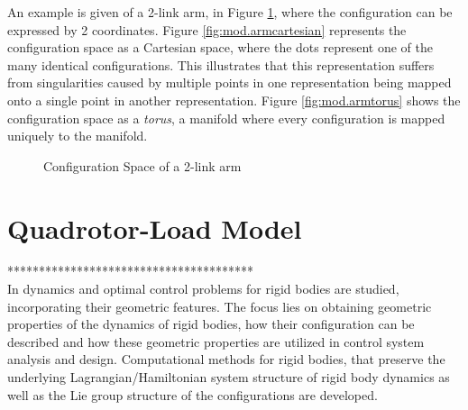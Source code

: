 An example is given of a 2-link arm, in Figure \ref{fig:mod.armmanifold}, where the configuration can be expressed by 2 coordinates. Figure \ref{fig:mod.armcartesian} represents the configuration space as a Cartesian space, where the dots represent one of the many identical configurations. This illustrates that this representation suffers from singularities caused by multiple points in one representation being mapped onto a single point in another representation. Figure \ref{fig:mod.armtorus} shows the configuration space as a \textit{torus}, a manifold where every configuration is mapped uniquely to the manifold.

\begin{figure}[h!]
	\centering
	\caption{Configuration Space of a 2-link arm\label{fig:mod.armmanifold}}
\end{figure}		

\section{Quadrotor-Load Model}	\label{sec:mod.QRLmod}
***************************************\\
In \cite{Lee2008} dynamics and optimal control problems for rigid bodies are studied, incorporating their geometric features. The focus lies on obtaining geometric properties of the dynamics of rigid bodies, how their configuration can be described and how these geometric properties are utilized in control system analysis and design. Computational methods for rigid bodies, that preserve the underlying Lagrangian/Hamiltonian system structure of rigid body dynamics as well as the Lie group structure of the configurations are developed.

